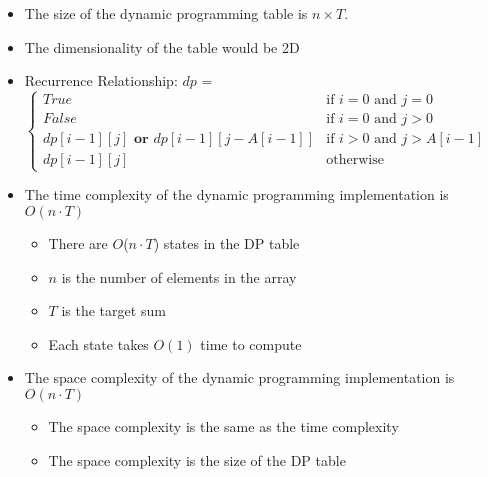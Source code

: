 \documentclass{article}[12pt]
\begin{document}
\begin{itemize}
  \item The size of the dynamic programming table is $n \times T$.
  \item The dimensionality of the table would be 2D
  \item Recurrence Relationship:
    $dp$ = $\begin{cases}
      True & \text{if } i = 0 \text{ and } j = 0\\
      False & \text{if } i = 0 \text{ and } j > 0 \\
      dp[i-1][j] \textbf{ or } dp[i-1][j-A[i-1]] & \text{if } i > 0 \text{ and } j > A[i-1] \\
      dp[i-1][j] & \text{otherwise}
    \end{cases}$
  \item The time complexity of the dynamic programming implementation is $O(n \cdot T)$
    \begin{itemize}
      \item There are $O$($n \cdot T$) states in the DP table
      \item $n$ is the number of elements in the array
      \item $T$ is the target sum
      \item Each state takes $O(1)$ time to compute
    \end{itemize}
  \item The space complexity of the dynamic programming implementation is $O(n \cdot T)$
    \begin{itemize}
      \item The space complexity is the same as the time complexity
      \item The space complexity is the size of the DP table
    \end{itemize}
\end{itemize}
\end{document}
